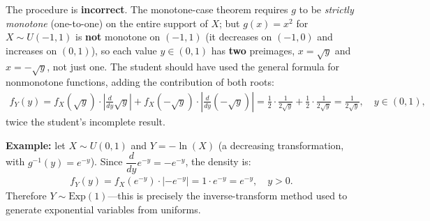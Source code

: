 \begin{solproblema}[prob:5ce800e]
	The procedure is \textbf{incorrect}. The monotone-case theorem requires $g$ to be \emph{strictly monotone} (one-to-one) on the entire support of $X$; but $g(x)=x^2$ for $X\sim U(-1,1)$ is \textbf{not} monotone on $(-1,1)$ (it decreases on $(-1,0)$ and increases on $(0,1)$), so each value $y\in(0,1)$ has \textbf{two} preimages, $x=\sqrt{y}$ and $x=-\sqrt{y}$, not just one. The student should have used the general formula for nonmonotone functions, adding the contribution of both roots:
	\begin{align*}
		f_Y(y) = f_X(\sqrt{y})\cdot\left|\frac{d}{dy}\sqrt{y}\right| + f_X(-\sqrt{y})\cdot\left|\frac{d}{dy}(-\sqrt{y})\right| = \frac{1}{2}\cdot\frac{1}{2\sqrt{y}} + \frac{1}{2}\cdot\frac{1}{2\sqrt{y}} = \frac{1}{2\sqrt{y}}, \quad y\in(0,1),
	\end{align*}
	twice the student's incomplete result.
\end{solproblema}

\begin{solproblema}[prob:12a4921]
	\textbf{Example:} let $X \sim U(0,1)$ and $Y = -\ln(X)$ (a decreasing transformation, with $g^{-1}(y)=e^{-y}$). Since $\dfrac{d}{dy}e^{-y} = -e^{-y}$, the density is:
	\begin{align*}
		f_Y(y) = f_X(e^{-y})\cdot|-e^{-y}| = 1\cdot e^{-y} = e^{-y}, \quad y>0.
	\end{align*}
	Therefore $Y \sim \text{Exp}(1)$---this is precisely the inverse-transform method used to generate exponential variables from uniforms.
\end{solproblema}
